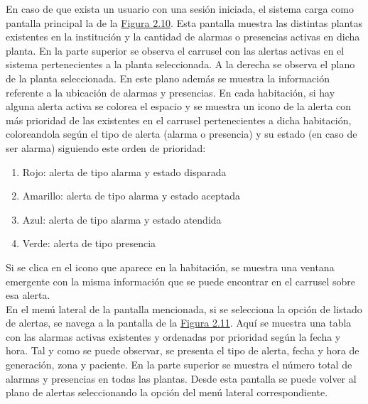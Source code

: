 En caso de que exista un usuario con una sesión iniciada, el sistema carga como pantalla principal la de la \hyperref[fig:map]{Figura 2.10}. Esta pantalla muestra las distintas plantas existentes en la institución y la cantidad de alarmas o presencias activas en dicha planta. En la parte superior se observa el carrusel con las alertas activas en el sistema pertenecientes a la planta seleccionada. A la derecha se observa el plano de la planta seleccionada. En este plano además se muestra la información referente a la ubicación de alarmas y presencias. En cada habitación, si hay alguna alerta activa se colorea el espacio y se muestra un icono de la alerta con más prioridad de las existentes en el carrusel pertenecientes a dicha habitación, coloreandola según el tipo de alerta (alarma o presencia) y su estado (en caso de ser alarma) siguiendo este orden de prioridad:
\begin{enumerate}
	\item Rojo: alerta de tipo alarma y estado disparada
	\item Amarillo: alerta de tipo alarma y estado aceptada
	\item Azul: alerta de tipo alarma y estado atendida
	\item Verde: alerta de tipo presencia
\end{enumerate}
Si se clica en el icono que aparece en la habitación, se muestra una ventana emergente con la misma información que se puede encontrar en el carrusel sobre esa alerta.\\

En el menú lateral de la pantalla mencionada, si se selecciona la opción de listado de alertas, se navega a la pantalla de la \hyperref[fig:list]{Figura 2.11}. Aquí se muestra una tabla con las alarmas activas existentes y ordenadas por prioridad según la fecha y hora. Tal y como se puede observar, se presenta el tipo de alerta, fecha y hora de generación, zona y paciente. En la parte superior se muestra el número total de alarmas y presencias en todas las plantas. Desde esta pantalla se puede volver al plano de alertas seleccionando la opción del menú lateral correspondiente.


\newpage

